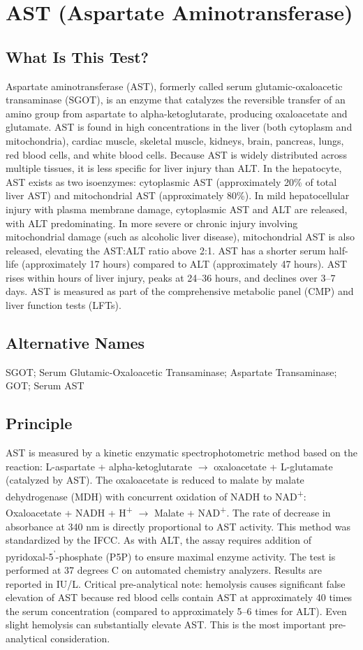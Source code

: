 \chapter{AST (Aspartate Aminotransferase)}

\section*{What Is This Test?}
Aspartate aminotransferase (AST), formerly called serum glutamic-oxaloacetic transaminase (SGOT), is an enzyme that catalyzes the reversible transfer of an amino group from aspartate to alpha-ketoglutarate, producing oxaloacetate and glutamate. AST is found in high concentrations in the liver (both cytoplasm and mitochondria), cardiac muscle, skeletal muscle, kidneys, brain, pancreas, lungs, red blood cells, and white blood cells. Because AST is widely distributed across multiple tissues, it is less specific for liver injury than ALT. In the hepatocyte, AST exists as two isoenzymes: cytoplasmic AST (approximately 20\% of total liver AST) and mitochondrial AST (approximately 80\%). In mild hepatocellular injury with plasma membrane damage, cytoplasmic AST and ALT are released, with ALT predominating. In more severe or chronic injury involving mitochondrial damage (such as alcoholic liver disease), mitochondrial AST is also released, elevating the AST:ALT ratio above 2:1. AST has a shorter serum half-life (approximately 17 hours) compared to ALT (approximately 47 hours). AST rises within hours of liver injury, peaks at 24--36 hours, and declines over 3--7 days. AST is measured as part of the comprehensive metabolic panel (CMP) and liver function tests (LFTs).

\section*{Alternative Names}
SGOT; Serum Glutamic-Oxaloacetic Transaminase; Aspartate Transaminase; GOT; Serum AST

\section*{Principle}
AST is measured by a kinetic enzymatic spectrophotometric method based on the reaction: L-aspartate + alpha-ketoglutarate $\rightarrow$ oxaloacetate + L-glutamate (catalyzed by AST). The oxaloacetate is reduced to malate by malate dehydrogenase (MDH) with concurrent oxidation of NADH to NAD\textsuperscript{+}: Oxaloacetate + NADH + H\textsuperscript{+} $\rightarrow$ Malate + NAD\textsuperscript{+}. The rate of decrease in absorbance at 340 nm is directly proportional to AST activity. This method was standardized by the IFCC. As with ALT, the assay requires addition of pyridoxal-5\textsuperscript{'}-phosphate (P5P) to ensure maximal enzyme activity. The test is performed at 37 degrees C on automated chemistry analyzers. Results are reported in IU/L. Critical pre-analytical note: hemolysis causes significant false elevation of AST because red blood cells contain AST at approximately 40 times the serum concentration (compared to approximately 5--6 times for ALT). Even slight hemolysis can substantially elevate AST. This is the most important pre-analytical consideration.

